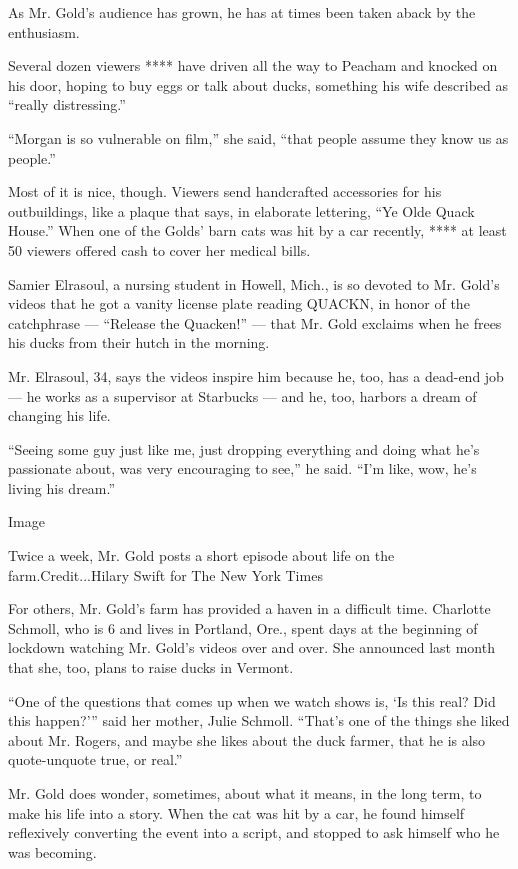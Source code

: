 As Mr. Gold's audience has grown, he has at times been taken aback by
the enthusiasm.

Several dozen viewers **** have driven all the way to Peacham and
knocked on his door, hoping to buy eggs or talk about ducks, something
his wife described as ``really distressing.''

``Morgan is so vulnerable on film,'' she said, ``that people assume they
know us as people.''

Most of it is nice, though. Viewers send handcrafted accessories for his
outbuildings, like a plaque that says, in elaborate lettering, ``Ye Olde
Quack House.'' When one of the Golds' barn cats was hit by a car
recently, **** at least 50 viewers offered cash to cover her medical
bills.

Samier Elrasoul, a nursing student in Howell, Mich., is so devoted to
Mr. Gold's videos that he got a vanity license plate reading QUACKN, in
honor of the catchphrase --- ``Release the Quacken!'' --- that Mr. Gold
exclaims when he frees his ducks from their hutch in the morning.

Mr. Elrasoul, 34, says the videos inspire him because he, too, has a
dead-end job --- he works as a supervisor at Starbucks --- and he, too,
harbors a dream of changing his life.

``Seeing some guy just like me, just dropping everything and doing what
he's passionate about, was very encouraging to see,'' he said. ``I'm
like, wow, he's living his dream.''

Image

Twice a week, Mr. Gold posts a short episode about life on the
farm.Credit...Hilary Swift for The New York Times

For others, Mr. Gold's farm has provided a haven in a difficult time.
Charlotte Schmoll, who is 6 and lives in Portland, Ore., spent days at
the beginning of lockdown watching Mr. Gold's videos over and over. She
announced last month that she, too, plans to raise ducks in Vermont.

``One of the questions that comes up when we watch shows is, `Is this
real? Did this happen?''' said her mother, Julie Schmoll. ``That's one
of the things she liked about Mr. Rogers, and maybe she likes about the
duck farmer, that he is also quote-unquote true, or real.''

Mr. Gold does wonder, sometimes, about what it means, in the long term,
to make his life into a story. When the cat was hit by a car, he found
himself reflexively converting the event into a script, and stopped to
ask himself who he was becoming.

